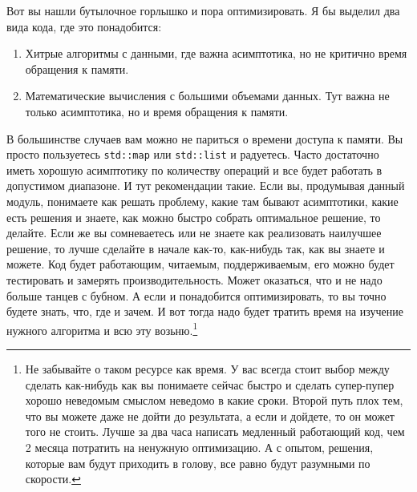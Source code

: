 \documentclass{article}
\begin{document}
Вот вы нашли бутылочное горлышко и пора оптимизировать. Я бы выделил два вида кода, где это понадобится:
\begin{enumerate}
\item Хитрые алгоритмы с данными, где важна асимптотика, но не критично время обращения к памяти.
\item Математические вычисления с большими объемами данных. Тут важна не только асимптотика, но и время обращения к памяти.
\end{enumerate}
В большинстве случаев вам можно не париться о времени доступа к памяти. Вы просто пользуетесь \verb"std::map" или \verb"std::list" и радуетесь. Часто достаточно иметь хорошую асимптотику по количеству операций и все будет работать в допустимом диапазоне. И тут рекомендации такие. Если вы, продумывая данный модуль, понимаете как решать проблему, какие там бывают асимптотики, какие есть решения и знаете, как можно быстро собрать оптимальное решение, то делайте. Если же вы сомневаетесь или не знаете как реализовать наилучшее решение, то лучше сделайте в начале как-то, как-нибудь так, как вы знаете и можете. Код будет работающим, читаемым, поддерживаемым, его можно будет тестировать и замерять производительность. Может оказаться, что и не надо больше танцев с бубном. А если и понадобится оптимизировать, то вы точно будете знать, что, где и зачем. И вот тогда надо будет тратить время на изучение нужного алгоритма и всю эту возьню.\footnote{Не забывайте о таком ресурсе как время. У вас всегда стоит выбор между сделать как-нибудь как вы понимаете сейчас быстро и сделать супер-пупер хорошо неведомым смыслом неведомо в какие сроки. Второй путь плох тем, что вы можете даже не дойти до результата, а если и дойдете, то он может того не стоить. Лучше за два часа написать медленный работающий код, чем 2 месяца потратить на ненужную оптимизацию. А с опытом, решения, которые вам будут приходить в голову, все равно будут разумными по скорости.}
\end{document}
